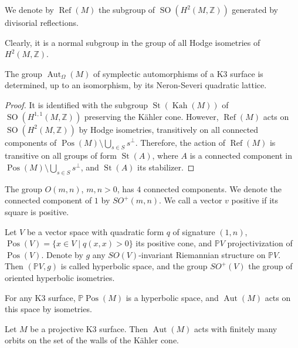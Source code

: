 \noindent
We denote by $\operatorname{Ref}(M)$ the subgroup
of $\operatorname{SO}(H^2(M,\mathbb{Z}))$
generated by divisorial reflections.

\noindent
Clearly, it is a normal subgroup in the group of
all Hodge isometries of $H^2(M,\mathbb{Z})$.

\begin{lemma}
The group $\operatorname{Aut}_{\Omega}(M)$ of
symplectic automorphisms of a K3 surface is
determined, up to an isomorphism, by its
Neron-Severi quadratic lattice.
\end{lemma}

\begin{proof}
It is identified with the subgroup
$\operatorname{St}(\operatorname{Kah}(M))$ of
$\operatorname{SO}(H^{1,1}(M,\mathbb{Z}))$
preserving the Kähler cone. However,
$\operatorname{Ref}(M)$ acts on
$\operatorname{SO}(H^2(M,\mathbb{Z}))$ by Hodge
isometries, transitively on all connected
components of
$\operatorname{Pos}(M)\setminus
\bigcup_{s\in S}s^\perp$.
Therefore, the action of $\operatorname{Ref}(M)$ is
transitive on all groups of form $\operatorname{St}(A)$,
where $A$ is a connected component in
$\operatorname{Pos}(M)\setminus
\bigcup_{s\in S}s^\perp$, and $\operatorname{St}(A)$
its stabilizer.
\end{proof}

\begin{remark}
The group $O(m,n)$, $m,n > 0$, has $4$ connected
components. We denote the connected component of $1$
by $SO^+(m,n)$. We call a vector $v$ positive if its
square is positive.
\end{remark}

\begin{definition}
Let $V$ be a vector space with quadratic form $q$
of signature $(1,n)$, $\operatorname{Pos}(V)=\{x\in
V \mid q(x,x)>0\}$ its positive cone, and
$\mathbb{P}V$ projectivization of $\operatorname{Pos}(V)$.
Denote by $g$ any $SO(V)$-invariant Riemannian
structure on $\mathbb{P}V$. Then $(\mathbb{P}V,g)$ is
called hyperbolic space, and the group $SO^+(V)$ the
group of oriented hyperbolic isometries.
\end{definition}

\begin{example}
For any K3 surface, $\mathbb{P}\operatorname{Pos}(M)$
is a hyperbolic space, and $\operatorname{Aut}(M)$
acts on this space by isometries.
\end{example}

\begin{theorem}[Sterk, 1985]
Let $M$ be a projective K3 surface. Then
$\operatorname{Aut}(M)$ acts with finitely many orbits
on the set of the walls of the Kähler cone.
\end{theorem}

